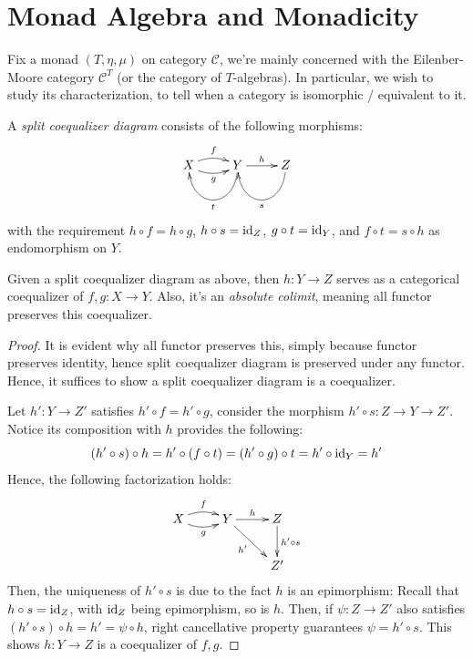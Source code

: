 \documentclass{article}
\begin{document}
\newpage

\section{Monad Algebra and Monadicity}

Fix a monad $(T,\eta,\mu)$ on category $\mathcal{C}$, we're mainly concerned with the Eilenber-Moore category $\mathcal{C}^T$ (or the category of $T$-algebras). In particular, we wish to study its characterization, to tell when a category is isomorphic / equivalent to it.

\begin{defn}
    A \emph{split coequalizer diagram} consists of the following morphisms:
    \[\xymatrix{
        X \ar@/_{-.5pc}/[r]^-{f} \ar@/_{.5pc}/[r]_-{g} & Y \ar@(d,d)[l]^-{t} \ar[r]^-{h} & Z \ar@(d,d)[l]^-{s}
    }\]
    with the requirement $h\circ f=h\circ g$, $h\circ s=\mathrm{id}_Z$, $g\circ t = \mathrm{id}_Y$, and $f\circ t=s\circ h$ as endomorphism on $Y$.
\end{defn}

\begin{lem}
    Given a split coequalizer diagram as above, then $h:Y\rightarrow Z$ serves as a categorical coequalizer of $f,g:X\rightarrow Y$. Also, it's an \emph{absolute colimit}, meaning all functor preserves this coequalizer.
\end{lem}
\begin{proof}
    It is evident why all functor preserves this, simply because functor preserves identity, hence split coequalizer diagram is preserved under any functor. Hence, it suffices to show a split coequalizer diagram is a coequalizer.

    Let $h':Y\rightarrow Z'$ satisfies $h'\circ f=h'\circ g$, consider the morphism $h'\circ s:Z\rightarrow Y\rightarrow Z'$. Notice its composition with $h$ provides the following:
    \[(h'\circ s)\circ h = h'\circ (f\circ t) = (h'\circ g)\circ t = h'\circ \mathrm{id}_{Y} = h'\]
    Hence, the following factorization holds:
    \[\xymatrix{
        X \ar@/_{-.5pc}/[r]^-{f} \ar@/_{.5pc}/[r]_-{g} & Y\ar[r]^-{h} \ar[dr]_-{h'} & Z \ar[d]^-{h'\circ s}\\
        && Z'
    }\]
    Then, the uniqueness of $h'\circ s$ is due to the fact $h$ is an epimorphism: Recall that $h\circ s=\mathrm{id}_Z$, with $\mathrm{id}_Z$ being epimorphism, so is $h$. Then, if $\psi:Z\rightarrow Z'$ also satisfies $(h'\circ s)\circ h=h' = \psi\circ h$, right cancellative property guarantees $\psi=h'\circ s$. This shows $h:Y\rightarrow Z$ is a coequalizer of $f,g$.
\end{proof}
\end{document}
